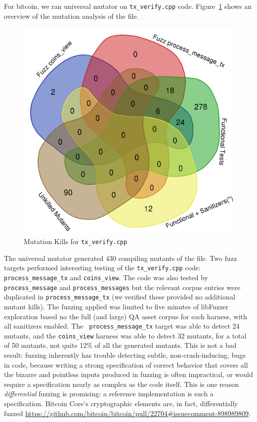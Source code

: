 \begin{sloppypar}

For bitcoin, we ran universal mutator on {\tt tx\_verify.cpp} code.
Figure~\ref{kills} shows an overview of the mutation analysis of the file.

\begin{figure}
\vspace{2mm}
\includegraphics[width=0.9\columnwidth]{kill_pre_valgrind.png}
\caption{Mutation Kills for {\tt tx\_verify.cpp}}
\label{kills}
\end{figure}

The universal mutator generated 430 compiling mutants of the file.
Two fuzz targets performed interesting testing of the {\tt tx\_verify.cpp} code:
{\tt process\_message\_tx} and {\tt coins\_view}.  The code was also
tested by {\tt process\_message} and {\tt process\_messages} but the
relevant corpus entries were duplicated in {\tt process\_message\_tx}
(we verified these provided no additional mutant kills).  The fuzzing
applied was limited to five minutes of libFuzzer exploration based no
the full (and large) QA asset corpus for each harness, with all
sanitizers enabled.  The {\tt
  process\_message\_tx} target was able to detect 24 mutants, and the
{\tt coins\_view} harness was able to detect 32 mutants, for a total
of 50 mutants, not quite 12\% of all the generated mutants.  This is
not a bad result: fuzzing inherently has trouble detecting subtle,
non-crash-inducing, bugs in code, because writing a strong specification of
correct behavior that covers all the bizarre and pointless inputs
produced in fuzzing is often impractical, or would require a
specification nearly as complex as the code itself.  This is one
reason \emph{differential} fuzzing is promising: a reference
implementation is such a specification.  Bitcoin Core's cryptographic
elements are, in fact, differentially fuzzed
\url{https://github.com/bitcoin/bitcoin/pull/22704#issuecomment-898989809}.
\end{sloppypar}


